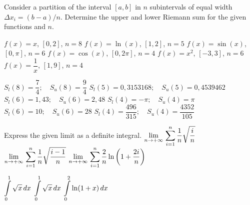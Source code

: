 \begin{Exercise}
Consider a partition of the interval $[a,b]$ in $n$ subintervals of equal width $\Delta x_i = (b-a)/n$. Determine the upper and lower Riemann sum for the given functions and $n$.
\begin{multicols}{2}
	\Question[difficulty = 1] $f(x)=x$, \quad $[0,2]$, \quad $n=8$
	\Question[difficulty = 1] $f(x)=\ln (x)$, \quad $[1,2]$, \quad $n=5$
	\Question[difficulty = 1] $f(x)=\sin (x)$, \quad $[0,\pi]$, \quad $n=6$
	\ifanalysis\Question[difficulty = 1]\fi\ifcalculus\Question[difficulty = 2]\fi $f(x)=\cos (x)$, \quad $[0,2\pi]$, \quad $n=4$
	\Question[difficulty = 1] $f(x)=x^2$, \quad $[-3,3]$, \quad $n=6$ 
	\ifanalysis\Question[difficulty = 1]\fi\ifcalculus\Question[difficulty = 2]\fi $f(x)=\dfrac{1}{x}$, \quad $[1,9]$, \quad $n=4$ 
	\EndCurrentQuestion
\end{multicols}
\end{Exercise}
\begin{Answer} \phantom{}
    
    \Question $S_l(8) = \dfrac{7}{4}; \quad S_u(8) = \dfrac{9}{4}$ 
    \Question $S_l(5) = 0,3153168; \quad S_u(5) = 0,4539462$ 
    \Question $S_l(6) = 1,43; \quad S_u(6) = 2,48$ 
    \Question $S_l(4) = -\pi; \quad S_u(4)  = \pi$ 
    \Question $S_l(6) = 10; \quad S_u(6)  = 28$ 
    \Question $S_l(4) = \dfrac{496}{315}; \quad S_u(4)  = \dfrac{4352}{105}$
 
\end{Answer}

\begin{Exercise}
Express the given limit as a definite integral.
	\Question[difficulty = 2]  $\displaystyle\lim_{n \rightarrow +\infty} \,\sum_{i=1}^n \dfrac{1}{n} \sqrt{\frac{i}{n}}$
	\Question[difficulty = 2]  $\displaystyle\lim_{n \rightarrow +\infty} \, \sum_{i=1}^n \dfrac{1}{n} \sqrt{\frac{i-1}{n}}$
	\Question[difficulty = 2]  $\displaystyle\lim_{n \rightarrow +\infty} \, \sum_{i=1}^n \dfrac{2}{n} \ln\left(1+{\frac{2i}{n}}\right)$
\end{Exercise}

\begin{Answer}
    \begin{multicols}{3}
    
    \Question $\displaystyle \int\limits_0^1 \sqrt{x}\, dx$
    \Question $\displaystyle \int\limits_0^1 \sqrt{x}\, dx$
    \Question $\displaystyle \int\limits_0^2 \ln(1+x)\, dx$
   \EndCurrentQuestion
    \end{multicols}
\end{Answer}

